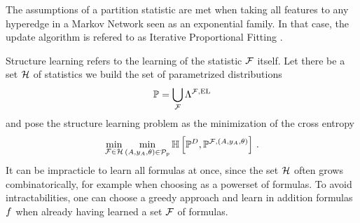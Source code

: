 The assumptions of a partition statistic are met when taking all features to any hyperedge in a Markov Network seen as an exponential family.
In that case, the update algorithm is refered to as Iterative Proportional Fitting \cite{wainwright_graphical_2008}.




Structure learning refers to the learning of the statistic $\mathcal{F}$ itself.
Let there be a set $\mathcal{H}$ of statistics we build the set of parametrized distributions
\begin{align*}
    \mathbb{P} = \bigcup_{\mathcal{F}} \Lambda^{\mathcal{F},\mathrm{EL}}
\end{align*}
and pose the structure learning problem as the minimization of the cross entropy
\begin{align*}
    \min_{\mathcal{F}\in\mathcal{H}} \min_{(A,y_{A},\theta)\in\mathcal{P}_{p}} \mathbb{H}\left[\mathbb{P}^{D},\mathbb{P}^{\mathcal{F},(A,y_{A},\theta)}\right] \, .
\end{align*}
It can be impracticle to learn all formulas at once, since the set $\mathcal{H}$ often grows combinatorically, for example when choosing as a powerset of formulas.
To avoid intractabilities, one can choose a greedy approach and learn in addition formulas $f$ when already having learned a set $\mathcal{F}$ of formulas.


